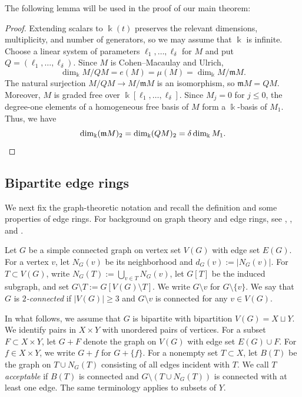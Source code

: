 \documentclass[a4paper,reqno,11pt]{amsart}
\newtheorem{lem}[thm]{Lemma}
\theoremstyle{definition}
\theoremstyle{remark}
\numberwithin{equation}{section}
\newcommand{\kk}{\Bbbk}
\newcommand{\frakm}{\mathfrak m}
\begin{document}
The following lemma will be used in the proof of our main theorem:
\begin{proof}
    Extending scalars to $\kk(t)$ preserves the relevant dimensions, multiplicity, and number of generators, so we may assume that $\kk$ is infinite.
    Choose a linear system of parameters $\ell_1,\ldots,\ell_\delta$ for $M$ and put $Q=(\ell_1,\ldots,\ell_\delta)$.
    Since $M$ is Cohen--Macaulay and Ulrich,
    \[
        \dim_\kk M/QM =e(M)=\mu(M)=\dim_\kk M/\frakm M.
    \]
    The natural surjection $M/QM\longrightarrow M/\frakm M$ is an isomorphism, so $\frakm M=QM$.
    Moreover, $M$ is graded free over $\kk[\ell_1,\ldots,\ell_\delta]$.
    Since $M_j=0$ for $j\le0$, the degree-one elements of a homogeneous free basis of $M$ form a $\kk$-basis of $M_1$.
    Thus, we have
    \[
        \dim_\kk (\frakm M)_2= \dim_\kk(QM)_2=\delta\dim_\kk M_1.\qedhere
    \]
\end{proof}

\subsection{Bipartite edge rings}\label{subsec:edge-rings}

We next fix the graph-theoretic notation and recall the definition and some properties of edge rings.
For background on graph theory and edge rings, see \cite{diestel2017graph}, \cite[Section 10]{villarreal2001monomial}, and \cite[Section 5]{herzog2018binomial}.

Let $G$ be a simple connected graph on vertex set $V(G)$ with edge set $E(G)$.
For a vertex $v$, let $N_G(v)$ be its neighborhood and $d_G(v):=|N_G(v)|$.
For $T\subset V(G)$, write $N_G(T):=\bigcup_{v\in T}N_G(v)$, let $G[T]$ be the induced subgraph, and set $G\setminus T:=G[V(G)\setminus T]$.
We write $G\setminus v$ for $G\setminus\{v\}$.
We say that $G$ is \textit{$2$-connected} if $|V(G)|\ge 3$ and $G\setminus v$ is connected for any $v\in V(G)$.

In what follows, we assume that $G$ is bipartite with bipartition $V(G)=X\sqcup Y$.
We identify pairs in $X\times Y$ with unordered pairs of vertices.
For a subset $F\subset X\times Y$, let $G+F$ denote the graph on $V(G)$ with edge set $E(G)\cup F$.
For $f\in X\times Y$, we write $G+f$ for $G+\{f\}$.
For a nonempty set $T\subset X$, let $B(T)$ be the graph on $T\cup N_G(T)$ consisting of all edges incident with $T$.
We call $T$ \textit{acceptable} if $B(T)$ is connected and $G\setminus(T\cup N_G(T))$ is connected with at least one edge.
The same terminology applies to subsets of $Y$.
\end{document}
